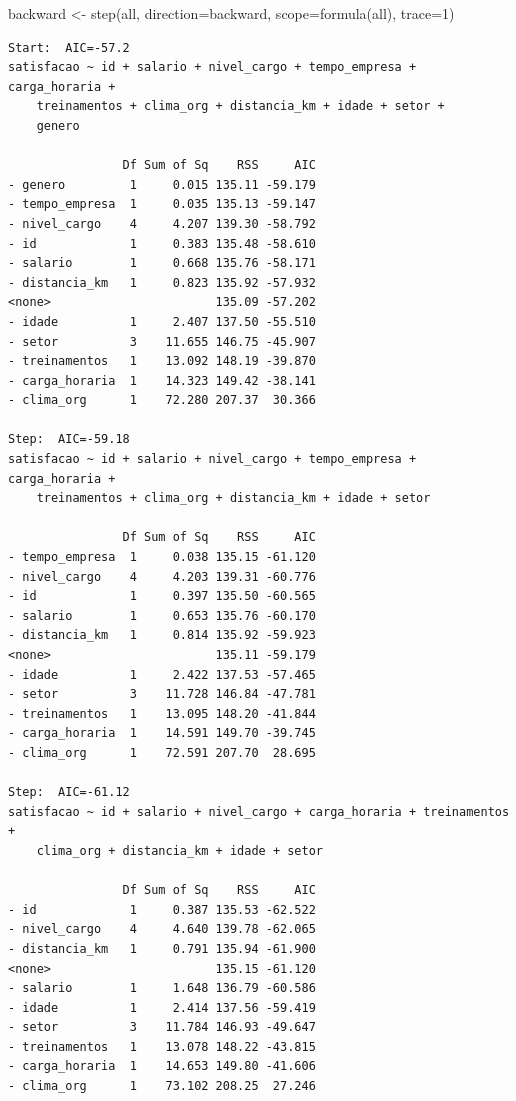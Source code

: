 \documentclass[
  letterpaper,
  DIV=11,
  numbers=noendperiod]{scrartcl}
\newenvironment{Shaded}{\begin{snugshade}}{\end{snugshade}}
\newcommand{\AttributeTok}[1]{\textcolor[rgb]{0.40,0.45,0.13}{#1}}
\newcommand{\DecValTok}[1]{\textcolor[rgb]{0.68,0.00,0.00}{#1}}
\newcommand{\FunctionTok}[1]{\textcolor[rgb]{0.28,0.35,0.67}{#1}}
\newcommand{\NormalTok}[1]{\textcolor[rgb]{0.00,0.23,0.31}{#1}}
\newcommand{\OtherTok}[1]{\textcolor[rgb]{0.00,0.23,0.31}{#1}}
\newcommand{\StringTok}[1]{\textcolor[rgb]{0.13,0.47,0.30}{#1}}
\begin{document}
\begin{Shaded}
\begin{Highlighting}[]
\NormalTok{backward }\OtherTok{\textless{}{-}} \FunctionTok{step}\NormalTok{(all, }\AttributeTok{direction=}\StringTok{\textquotesingle{}backward\textquotesingle{}}\NormalTok{, }\AttributeTok{scope=}\FunctionTok{formula}\NormalTok{(all), }\AttributeTok{trace=}\DecValTok{1}\NormalTok{)}
\end{Highlighting}
\end{Shaded}

\begin{verbatim}
Start:  AIC=-57.2
satisfacao ~ id + salario + nivel_cargo + tempo_empresa + carga_horaria + 
    treinamentos + clima_org + distancia_km + idade + setor + 
    genero

                Df Sum of Sq    RSS     AIC
- genero         1     0.015 135.11 -59.179
- tempo_empresa  1     0.035 135.13 -59.147
- nivel_cargo    4     4.207 139.30 -58.792
- id             1     0.383 135.48 -58.610
- salario        1     0.668 135.76 -58.171
- distancia_km   1     0.823 135.92 -57.932
<none>                       135.09 -57.202
- idade          1     2.407 137.50 -55.510
- setor          3    11.655 146.75 -45.907
- treinamentos   1    13.092 148.19 -39.870
- carga_horaria  1    14.323 149.42 -38.141
- clima_org      1    72.280 207.37  30.366

Step:  AIC=-59.18
satisfacao ~ id + salario + nivel_cargo + tempo_empresa + carga_horaria + 
    treinamentos + clima_org + distancia_km + idade + setor

                Df Sum of Sq    RSS     AIC
- tempo_empresa  1     0.038 135.15 -61.120
- nivel_cargo    4     4.203 139.31 -60.776
- id             1     0.397 135.50 -60.565
- salario        1     0.653 135.76 -60.170
- distancia_km   1     0.814 135.92 -59.923
<none>                       135.11 -59.179
- idade          1     2.422 137.53 -57.465
- setor          3    11.728 146.84 -47.781
- treinamentos   1    13.095 148.20 -41.844
- carga_horaria  1    14.591 149.70 -39.745
- clima_org      1    72.591 207.70  28.695

Step:  AIC=-61.12
satisfacao ~ id + salario + nivel_cargo + carga_horaria + treinamentos + 
    clima_org + distancia_km + idade + setor

                Df Sum of Sq    RSS     AIC
- id             1     0.387 135.53 -62.522
- nivel_cargo    4     4.640 139.78 -62.065
- distancia_km   1     0.791 135.94 -61.900
<none>                       135.15 -61.120
- salario        1     1.648 136.79 -60.586
- idade          1     2.414 137.56 -59.419
- setor          3    11.784 146.93 -49.647
- treinamentos   1    13.078 148.22 -43.815
- carga_horaria  1    14.653 149.80 -41.606
- clima_org      1    73.102 208.25  27.246


\end{verbatim}
\end{document}
